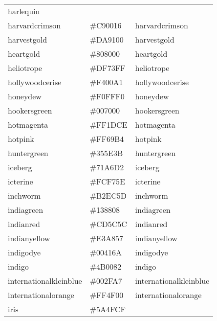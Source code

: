 \documentclass[
]{article}
\begin{document}
\begin{longtable}[]{@{}lll@{}}
\textcolor[rgb]{0.25,1.0,0.0}{harlequin             }\tabularnewline
harvardcrimson & \colorbox[rgb]{0.79,0.0,0.09}{\#C90016} &
\textcolor[rgb]{0.79,0.0,0.09}{harvardcrimson        }\tabularnewline
harvestgold & \colorbox[rgb]{0.85,0.57,0.0}{\#DA9100} &
\textcolor[rgb]{0.85,0.57,0.0}{harvestgold           }\tabularnewline
heartgold & \colorbox[rgb]{0.5,0.5,0.0}{\#808000} &
\textcolor[rgb]{0.5,0.5,0.0}{heartgold             }\tabularnewline
heliotrope & \colorbox[rgb]{0.87,0.45,1.0}{\#DF73FF} &
\textcolor[rgb]{0.87,0.45,1.0}{heliotrope            }\tabularnewline
hollywoodcerise & \colorbox[rgb]{0.96,0.0,0.63}{\#F400A1} &
\textcolor[rgb]{0.96,0.0,0.63}{hollywoodcerise       }\tabularnewline
honeydew & \colorbox[rgb]{0.94,1.0,0.94}{\#F0FFF0} &
\textcolor[rgb]{0.94,1.0,0.94}{honeydew              }\tabularnewline
hookersgreen & \colorbox[rgb]{0.0,0.44,0.0}{\#007000} &
\textcolor[rgb]{0.0,0.44,0.0}{hookersgreen          }\tabularnewline
hotmagenta & \colorbox[rgb]{1.0,0.11,0.81}{\#FF1DCE} &
\textcolor[rgb]{1.0,0.11,0.81}{hotmagenta            }\tabularnewline
hotpink & \colorbox[rgb]{1.0,0.41,0.71}{\#FF69B4} &
\textcolor[rgb]{1.0,0.41,0.71}{hotpink               }\tabularnewline
huntergreen & \colorbox[rgb]{0.21,0.37,0.23}{\#355E3B} &
\textcolor[rgb]{0.21,0.37,0.23}{huntergreen           }\tabularnewline
iceberg & \colorbox[rgb]{0.44,0.65,0.82}{\#71A6D2} &
\textcolor[rgb]{0.44,0.65,0.82}{iceberg               }\tabularnewline
icterine & \colorbox[rgb]{0.99,0.97,0.37}{\#FCF75E} &
\textcolor[rgb]{0.99,0.97,0.37}{icterine              }\tabularnewline
inchworm & \colorbox[rgb]{0.7,0.93,0.36}{\#B2EC5D} &
\textcolor[rgb]{0.7,0.93,0.36}{inchworm              }\tabularnewline
indiagreen & \colorbox[rgb]{0.07,0.53,0.03}{\#138808} &
\textcolor[rgb]{0.07,0.53,0.03}{indiagreen            }\tabularnewline
indianred & \colorbox[rgb]{0.8,0.36,0.36}{\#CD5C5C} &
\textcolor[rgb]{0.8,0.36,0.36}{indianred             }\tabularnewline
indianyellow & \colorbox[rgb]{0.89,0.66,0.34}{\#E3A857} &
\textcolor[rgb]{0.89,0.66,0.34}{indianyellow          }\tabularnewline
indigodye & \colorbox[rgb]{0.0,0.25,0.42}{\#00416A} &
\textcolor[rgb]{0.0,0.25,0.42}{indigodye             }\tabularnewline
indigo & \colorbox[rgb]{0.29,0.0,0.51}{\#4B0082} &
\textcolor[rgb]{0.29,0.0,0.51}{indigo                }\tabularnewline
internationalkleinblue & \colorbox[rgb]{0.0,0.18,0.65}{\#002FA7} &
\textcolor[rgb]{0.0,0.18,0.65}{internationalkleinblue}\tabularnewline
internationalorange & \colorbox[rgb]{1.0,0.31,0.0}{\#FF4F00} &
\textcolor[rgb]{1.0,0.31,0.0}{internationalorange   }\tabularnewline
iris & \colorbox[rgb]{0.35,0.31,0.81}{\#5A4FCF} &

\end{longtable}
\end{document}
